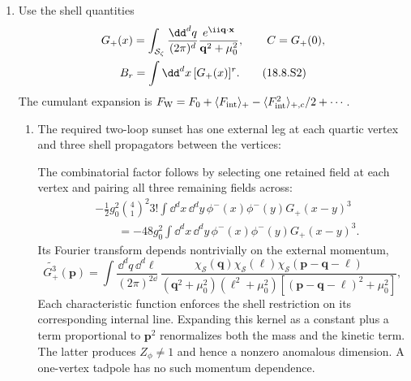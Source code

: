 \begin{enumerate}
\begin{enumerate}
    \item[(e)]
    Use the shell quantities
    \begin{gather}
      G_+(x)=\int_{\mathcal S_\zeta}\frac{\dd^dq}{(2\pi)^d}
        \frac{e^{\ii\mathbf q\cdot\mathbf x}}
             {\mathbf q^2+\mu_0^2},
      \qquad C=G_+(0),
      \notag\\
      B_r=\int \dd^dx\,[G_+(x)]^r.
      \tag{18.8.S2}
    \end{gather}
    The cumulant expansion is
    \(F_{\rm W}=F_0+\langle F_{\rm int}\rangle_+
      -\langle F_{\rm int}^2\rangle_{+,c}/2+\cdots\).
    \begin{enumerate}
      \item[(i)]
      The required two-loop sunset has one external leg at each quartic
      vertex and three shell propagators between the vertices:
      \begin{center}
      \end{center}
      The combinatorial factor follows by selecting one retained field at
      each vertex and pairing all three remaining fields across:
      \[
      \begin{split}
        &-\frac12g_0^2\binom41^2 3!
        \int \dd^dx\,\dd^dy\,
          \phi^-(x)\phi^-(y)G_+(x-y)^3\\
        &\qquad{}=
        -48g_0^2\int \dd^dx\,\dd^dy\,
          \phi^-(x)\phi^-(y)G_+(x-y)^3.
      \end{split}
      \]
      Its Fourier transform depends nontrivially on the external momentum,
      \[
        \widetilde{G_+^3}(\mathbf p)
        =\int\frac{\dd^dq\,\dd^d\ell}{(2\pi)^{2\dd}}\,
          \frac{\chi_{\mathcal S}(\mathbf q)
                \chi_{\mathcal S}(\boldsymbol\ell)
                \chi_{\mathcal S}(\mathbf p-\mathbf q-\boldsymbol\ell)}
          {(\mathbf q^2+\mu_0^2)(\boldsymbol\ell^2+\mu_0^2)
           [(\mathbf p-\mathbf q-\boldsymbol\ell)^2+\mu_0^2]},
      \]
      Each characteristic function enforces the shell restriction on its
      corresponding internal line.
      Expanding this kernel as a constant plus a term proportional to
      \(\mathbf p^2\) renormalizes both the mass and the kinetic term.
      The latter produces \(Z_\phi\neq1\) and hence a nonzero anomalous
      dimension.  A one-vertex tadpole has no such momentum dependence.


\end{enumerate}
\end{enumerate}
\end{enumerate}
